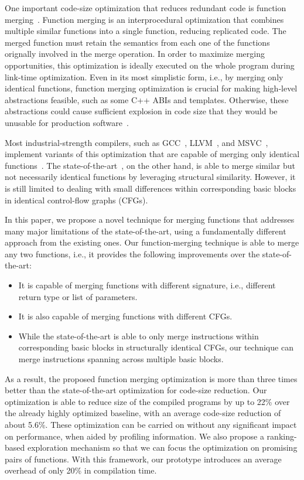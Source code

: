 One important code-size optimization that reduces redundant code is function
merging~\cite{tallam10,edler14}.
Function merging is an interprocedural optimization that combines multiple
similar functions into a single function, reducing replicated code.
The merged function must retain the semantics from each one of the functions
orignally involved in the merge operation.
In order to maximize merging opportunities, this optimization is ideally
executed on the whole program during link-time optimization.
Even in its most simplistic form, i.e., by merging only identical functions,
function merging optimization is crucial for making high-level abstractions
feasible, such as some C++ ABIs and templates.
Otherwise, these abstractions could cause sufficient explosion in code size that
they would be unusable for production software~\cite{tallam10,kwan12}.

Most industrial-strength compilers, such as GCC~\cite{gcc}, LLVM~\cite{llvm},
and MSVC~\cite{msvc-icf}, implement variants of this optimization that are
capable of merging only identical functions~\cite{tallam10,kwan12,livska14}.
The state-of-the-art~\cite{edler14}, on the other hand, is able to merge similar
but not necessarily identical functions by leveraging structural similarity.
However, it is still limited to dealing with small differences within
corresponding basic blocks in identical control-flow graphs (CFGs).

In this paper, we propose a novel technique for merging functions
that addresses many major limitations of the state-of-the-art, using a
fundamentally different approach from the existing ones.
Our function-merging technique is able to merge any two functions, i.e., it
provides the following improvements over the state-of-the-art:
\begin{itemize}[noitemsep,topsep=0pt]
  \item It is capable of merging functions with different signature, i.e.,
  different return type or list of parameters.
  \item It is also capable of merging functions with different CFGs.
  \item While the state-of-the-art is able to only merge instructions within
  corresponding basic blocks in structurally identical CFGs,
  our technique can merge instructions spanning across multiple basic blocks.
\end{itemize}
As a result, the proposed function merging optimization is
more than three times better than the state-of-the-art optimization for
code-size reduction.
Our optimization is able to reduce size of the compiled programs by up to
22\% over the already highly optimized baseline, with an average code-size
reduction of about 5.6\%.
These optimization can be carried on without any significant impact on
performance, when aided by profiling information.
We also propose a ranking-based exploration mechanism so that we can focus
the optimization on promising pairs of functions.
With this framework, our prototype introduces an average overhead of only 20\%
in compilation time.



